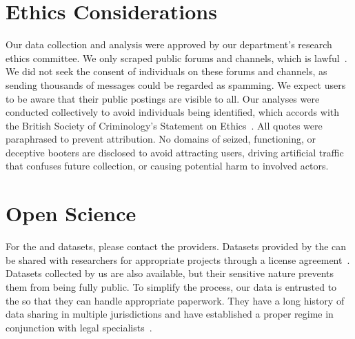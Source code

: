 \documentclass[letterpaper,twocolumn,10pt]{article}
\begin{document}
\appendix
\section{Ethics Considerations} \label{appendix:ethical-issues}
Our data collection and analysis were approved by our department's research ethics committee. We only scraped public forums and channels, which is lawful~\cite{webscrapinglegal}. We did not seek the consent of individuals on these forums and channels, as sending thousands of messages could be regarded as spamming. We expect users to be aware that their public postings are visible to all. Our analyses were conducted collectively to avoid individuals being identified, which accords with the British Society of Criminology’s Statement on Ethics~\cite{britishethics}. All quotes were paraphrased to prevent attribution. No domains of seized, functioning, or deceptive booters are disclosed to avoid attracting users, driving artificial traffic that confuses future collection, or causing potential harm to involved actors.

\section{Open Science} \label{appendix:data-licensing}
For the \netscout and \amppot datasets, please contact the providers. Datasets provided by the \ccc can be shared with researchers for appropriate projects through a license agreement~\cite{wilson2024identifying}. Datasets collected by us are also available, but their sensitive nature prevents them from being fully public. To simplify the process, our data is entrusted to the \ccc so that they can handle appropriate paperwork. They have a long history of data sharing in multiple jurisdictions and have established a proper regime in conjunction with legal specialists~\cite{cccagreement}.



\end{document}
